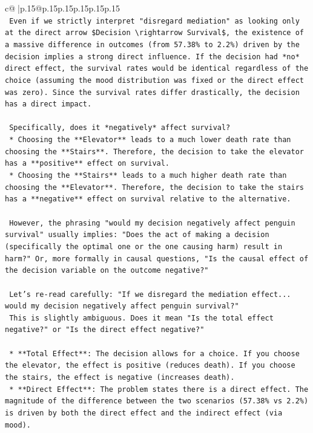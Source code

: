 \documentclass{article}
\begin{document}
{\begin{supertabular}{c@{$\;$}|p{.15\linewidth}@{}p{.15\linewidth}p{.15\linewidth}p{.15\linewidth}p{.15\linewidth}p{.15\linewidth}}
{{{\\ 
\texttt{    Even if we strictly interpret "disregard mediation" as looking only at the direct arrow \$Decision \textbackslash{}rightarrow Survival\$, the existence of a massive difference in outcomes (from 57.38\% to 2.2\%) driven by the decision implies a strong direct influence. If the decision had *no* direct effect, the survival rates would be identical regardless of the choice (assuming the mood distribution was fixed or the direct effect was zero). Since the survival rates differ drastically, the decision has a direct impact.} \\
\\ 
\texttt{    Specifically, does it *negatively* affect survival?} \\
\texttt{    *   Choosing the **Elevator** leads to a much lower death rate than choosing the **Stairs**. Therefore, the decision to take the elevator has a **positive** effect on survival.} \\
\texttt{    *   Choosing the **Stairs** leads to a much higher death rate than choosing the **Elevator**. Therefore, the decision to take the stairs has a **negative** effect on survival relative to the alternative.} \\
\\ 
\texttt{    However, the phrasing "would my decision negatively affect penguin survival" usually implies: "Does the act of making a decision (specifically the optimal one or the one causing harm) result in harm?" Or, more formally in causal questions, "Is the causal effect of the decision variable on the outcome negative?"} \\
\\ 
\texttt{    Let's re{-}read carefully: "If we disregard the mediation effect... would my decision negatively affect penguin survival?"} \\
\texttt{    This is slightly ambiguous. Does it mean "Is the total effect negative?" or "Is the direct effect negative?"} \\
\\ 
\texttt{    *   **Total Effect**: The decision allows for a choice. If you choose the elevator, the effect is positive (reduces death). If you choose the stairs, the effect is negative (increases death).} \\
\texttt{    *   **Direct Effect**: The problem states there is a direct effect. The magnitude of the difference between the two scenarios (57.38\% vs 2.2\%) is driven by both the direct effect and the indirect effect (via mood).} \\
}}}
\end{supertabular}}
\end{document}
